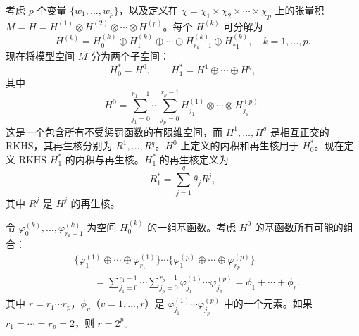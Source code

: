 考虑 $p$ 个变量 $\{w_1,\ldots,w_p\}$，以及定义在 $\chi=\chi_1\times\chi_2\times\cdots\times\chi_p$ 上的张量积 $M=H=H^{(1)}\otimes H^{(2)}\otimes\cdots\otimes H^{(p)}$。每个 $H^{(k)}$ 可分解为
\[
H^{(k)}=H_0^{(k)}\oplus H_1^{(k)}\oplus\cdots
\oplus H_{r_k-1}^{(k)}\oplus H_{\ast1}^{(k)},
\quad k=1,\ldots,p.
\]
现在将模型空间 $M$ 分为两个子空间：
\[
H_0^*=H^0,\qquad H_1^*=H^1\oplus\cdots\oplus H^q,
\]
其中
\[
H^0=\sum_{j_1=0}^{r_1-1}\cdots\sum_{j_p=0}^{r_p-1}
H_{j_1}^{(1)}\otimes\cdots\otimes H_{j_p}^{(p)}.
\]
这是一个包含所有不受惩罚函数的有限维空间，而 $H^1,\ldots,H^q$ 是相互正交的 RKHS，其再生核分别为 $R^1,\ldots,R^q$。$H^0$ 上定义的内积和再生核用于 $H_0^*$。现在定义 RKHS $H_1^*$ 的内积与再生核。$H_1^*$ 的再生核定义为
\[
R_1^*=\sum_{j=1}^{q}\theta_jR^j,
\]
其中 $R^j$ 是 $H^j$ 的再生核。

令 $\varphi_0^{(k)},\ldots,\varphi_{r_k-1}^{(k)}$ 为空间 $H_0^{(k)}$ 的一组基函数。考虑 $H^0$ 的基函数所有可能的组合：
\begin{equation}
\begin{aligned}
&\{\varphi_1^{(1)}\oplus\cdots\oplus\varphi_{r_1}^{(1)}\}
\cdots
\{\varphi_1^{(p)}\oplus\cdots\oplus\varphi_{r_p}^{(p)}\}\\
&\qquad=\sum_{j_1=0}^{r_1-1}\cdots\sum_{j_p=0}^{r_p-1}
\varphi_{j_1}^{(1)}\cdots\varphi_{j_p}^{(p)}
=\phi_1+\cdots+\phi_r.
\end{aligned}\tag{2.87}
\end{equation}
其中 $r=r_1\cdots r_p$，$\phi_v$（$v=1,\ldots,r$）是 $\varphi_{j_1}^{(1)}\cdots\varphi_{j_p}^{(p)}$ 中的一个元素。如果 $r_1=\cdots=r_p=2$，则 $r=2^p$。

